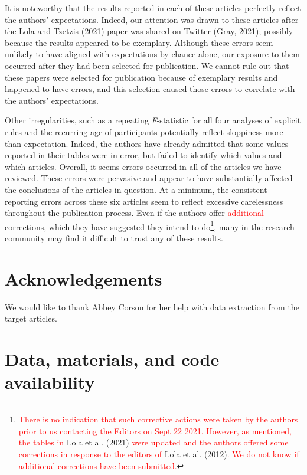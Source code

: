 \documentclass[
  english,
  man, donotrepeattitle,floatsintext]{apa7}
\begin{document}
It is noteworthy that the results reported in each of these articles perfectly reflect the authors' expectations. Indeed, our attention was drawn to these articles after the Lola and Tzetzis (2021) paper was shared on Twitter (Gray, 2021); possibly because the results appeared to be exemplary. Although these errors seem unlikely to have aligned with expectations by chance alone, our exposure to them occurred after they had been selected for publication. We cannot rule out that these papers were selected for publication because of exemplary results and happened to have errors, and this selection caused those errors to correlate with the authors' expectations.

Other irregularities, such as a repeating \emph{F}-statistic for all four analyses of explicit rules and the recurring age of participants potentially reflect sloppiness more than expectation. Indeed, the authors have already admitted that some values reported in their tables were in error, but failed to identify which values and which articles. Overall, it seems errors occurred in all of the articles we have reviewed. These errors were pervasive and appear to have substantially affected the conclusions of the articles in question. At a minimum, the consistent reporting errors across these six articles seem to reflect excessive carelessness throughout the publication process. Even if the authors offer \textcolor{red}{additional} corrections, which they have suggested they intend to do\footnote{\textcolor{red}{There is no indication that such corrective actions were taken by the authors prior to us contacting the Editors on Sept 22 2021. However, as mentioned, the tables in} Lola et al. (2021) \textcolor{red}{were updated and the authors offered some corrections in response to the editors of} Lola et al. (2012)\textcolor{red}{. We do not know if additional corrections have been submitted.}}, many in the research community may find it difficult to trust any of these results.

\newpage

\hypertarget{acknowledgements}{%
\section{Acknowledgements}\label{acknowledgements}}

We would like to thank Abbey Corson for her help with data extraction from the target articles.

\hypertarget{data-materials-and-code-availability}{%
\section{Data, materials, and code availability}\label{data-materials-and-code-availability}}
\end{document}
